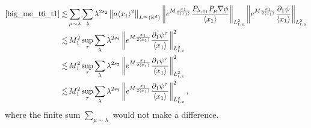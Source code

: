 \documentclass[10pt,twoside,a4paper]{article}
\numberwithin{equation}{section}\allowdisplaybreaks
\begin{document}
\begin{align*}
	\eqref{big_me_t6_t1} \lesssim &\sum_{\mu\sim \lambda} \sum_{\lambda} \lambda^{ 2s_2}  \left\|a \langle x_1 \rangle^2\right\|_{L^{\infty}(\mathbb{R}^d)} \left\|e^{M \frac{x_1}{2\langle x_1\rangle} }  \frac{  P_{\lambda, e_1}  P_\mu \nabla \phi }{\langle x_1 \rangle } \right\|_{L^2_{t,x}}\left\|e^{M \frac{x_1}{2\langle x_1\rangle} }  \frac{\partial_1 \psi }{\langle x_1\rangle }  \right\|_{L^2_{t,x}}\\
	\lesssim &   \,M_1^2   \sup_{\tau} \sum_{\lambda} \lambda^{ 2s_2}\left\|e^{M \frac{x_1}{2\langle x_1\rangle} }  \frac{\partial_1 \psi^\tau  }{\langle x_1\rangle }  \right\|_{L^2_{t,x}}^2\\
	\lesssim &  \,M_1^2    \sup_{\tau}\sum_{\lambda} \lambda^{ 2s_2}\left\|e^{M \frac{x_1}{2\langle x_1\rangle} }  \frac{\partial_1 \psi^\tau  }{\langle x_1\rangle }  \right\|_{L^2_{t,x}}^2 \\
	\lesssim & \,M_1^2   \sup_{\tau}\sum_{\lambda} \lambda^{ 2s_2}\left\|e^{M \frac{x_1}{2\langle x_1\rangle} }  \frac{\partial_1 \psi^\tau  }{\langle x_1\rangle }  \right\|_{L^2_{t,x}}^2,
\end{align*}
where the  finite sum $\sum_{\mu\sim \lambda}  $ would not make a difference.
\end{document}
